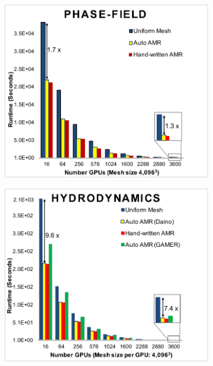 \documentclass{book}
\begin{document}
\begin{figure}
\centering
\begin{subfigure}[t]{0.32\textwidth}
\centering
\includegraphics[width=\textwidth]{figs/amr06.pdf} 
\end{subfigure}
\begin{subfigure}[t]{0.32\textwidth}
\centering
\includegraphics[width=\textwidth]{figs/amr07.pdf} 
\end{subfigure}
\begin{subfigure}[t]{0.32\textwidth}

\end{subfigure}
\end{figure}
\end{document}
